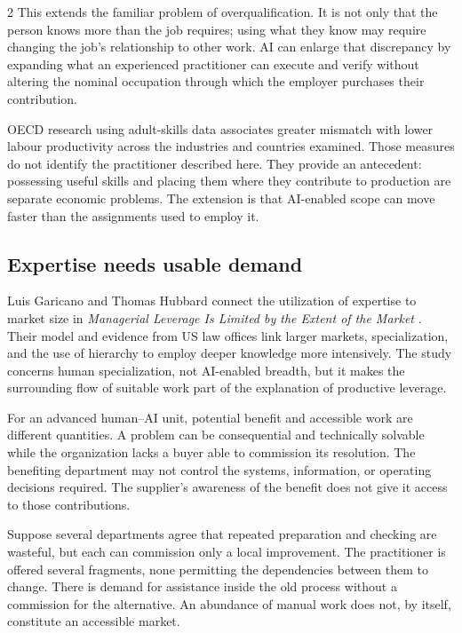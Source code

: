 \begin{multicols}{2}
This extends the familiar problem of overqualification. It is not only
that the person knows more than the job requires; using what they know
may require changing the job's relationship to other work. AI can
enlarge that discrepancy by expanding what an experienced practitioner
can execute and verify without altering the nominal occupation through
which the employer purchases their contribution.

OECD research using adult-skills data \citep{mcgowan2015mismatch}
associates greater mismatch with lower labour productivity across the
industries and countries examined. Those measures do not identify the
practitioner described here. They provide an antecedent: possessing
useful skills and placing them where they contribute to production are
separate economic problems. The extension is that AI-enabled scope can
move faster than the assignments used to employ it.

\subsection{Expertise needs usable
demand}\label{expertise-needs-usable-demand}

Luis Garicano and Thomas Hubbard connect the utilization of expertise to
market size in \emph{Managerial Leverage Is Limited by the Extent of the
Market} \citep{garicano2007leverage}. Their model and evidence from US
law offices link larger markets, specialization, and the use of
hierarchy to employ deeper knowledge more intensively. The study
concerns human specialization, not AI-enabled breadth, but it makes the
surrounding flow of suitable work part of the explanation of productive
leverage.

For an advanced human--AI unit, potential benefit and accessible work
are different quantities. A problem can be consequential and technically
solvable while the organization lacks a buyer able to commission its
resolution. The benefiting department may not control the systems,
information, or operating decisions required. The supplier's awareness
of the benefit does not give it access to those contributions.

Suppose several departments agree that repeated preparation and checking
are wasteful, but each can commission only a local improvement. The
practitioner is offered several fragments, none permitting the
dependencies between them to change. There is demand for assistance
inside the old process without a commission for the alternative. An
abundance of manual work does not, by itself, constitute an accessible
market.


\end{multicols}
